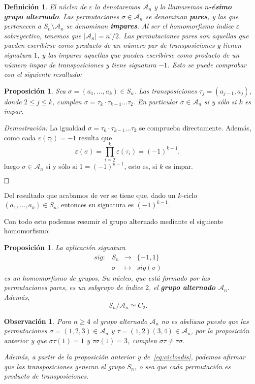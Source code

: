 \documentclass[12pt]{article}
\newtheorem{proposition}[theorem]{Proposición}
\newtheorem{definition}[theorem]{Definición}
\newtheorem{observation}{Observación}[theorem]
\begin{document}
\begin{definition}El núcleo de $\varepsilon$ lo denotaremos $\mathcal{A}_{n}$ y lo llamaremos \textbf{$n$-ésimo grupo alternado}. Las permutaciones $\sigma \in \mathcal{A}_{n}$ se denominan \textbf{pares}, y las que pertenecen a $S_{n} \setminus \mathcal{A}_{n}$ se denominan \textbf{impares}. Al ser el homomorfismo índice $\varepsilon$ sobreyectivo, tenemos que $|\mathcal{A}_{n}| = n!/2$. Las permutaciones pares son aquellas que pueden escribirse como producto de un número par de transposiciones y tienen signatura $1$, y las impares aquellas que pueden escribirse como producto de un número impar de transposiciones y tiene signatura $-1$. Esto se puede comprobar con el siguiente resultado:
\end{definition}

\begin{proposition}\label{eq:cicimpar} Sea $\sigma = (a_{1}, \ldots, a_{k}) \in S_{n}$. Las transposiciones $\tau_{j} = (a_{j-1}, a_{j})$, donde $2\leq j \leq k$, cumplen $\sigma = \tau_{k} \cdot \tau_{k-1} \ldots \tau_{2}.$ En particular $\sigma \in \mathcal{A}_{n}$ si y sólo si $k$ es impar.
\end{proposition}
\emph{Demostración: }La igualdad $\sigma = \tau_{k} \cdot \tau_{k-1} \ldots \tau_{2}$ se comprueba directamente. Además, como cada $\varepsilon(\tau_{i}) = -1$ resulta que $$\varepsilon(\sigma) = \prod_{i=2}^{k}\varepsilon(\tau_{i}) = (-1)^{k-1},$$ luego $\sigma \in \mathcal{A}_{n}$ si y sólo si $1 = (-1)^{k-1}$, esto es, si $k$ es impar.

$\hfill \square$

Del resultado que acabamos de ver se tiene que, dado un $k$-ciclo $(a_{1}, \ldots, a_{k}) \in S_{n}$, entonces su signatura es $(-1)^{k-1}$.

Con todo esto podemos resumir el grupo alternado mediante el siguiente homomorfismo:
\begin{proposition}La aplicación signatura $$\begin{array}{rccl}
sig \colon &S_{n}& \longrightarrow &\lbrace -1, 1\rbrace\\
&\sigma& \longmapsto &sig(\sigma)
\end{array}
$$
es un homomorfismo de grupos. Su núcleo, que está formado por las permutaciones pares, es un subgrupo de índice $2$, el \textbf{grupo alternado $\mathcal{A}_{n}$}. Además, $$S_{n}/\mathcal{A}_{n} \simeq C_{2}.$$
\end{proposition}


\begin{observation} Para $n \geq 4$ el grupo alternado $\mathcal{A}_{n}$ no es abeliano puesto que las permutaciones $\sigma = (1,2,3) \in \mathcal{A}_{n}$ y $\tau = (1,2)(3,4) \in \mathcal{A}_{n}$, por la proposición anterior y que $\sigma\tau(1) = 1$ y $\tau\sigma(1)=3$, cumplen $\sigma\tau \neq \tau\sigma$.

Además, a partir de la proposición anterior y de~\ref{eq:ciclosdis}, podemos afirmar que las transposiciones generan el grupo $S_{n}$, o sea que cada permutación es producto de transposiciones.
\end{observation}
\end{document}
